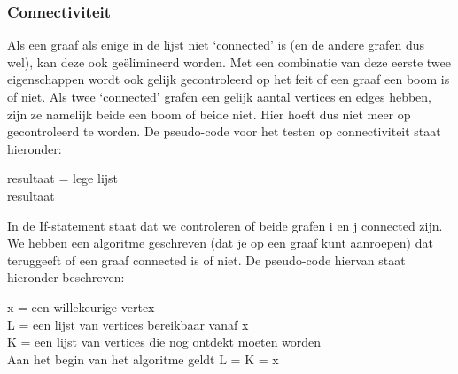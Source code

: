\documentclass{article}
\begin{document}
\subsubsection{Connectiviteit}
Als een graaf als enige in de lijst niet ‘connected’ is (en de andere grafen dus wel), kan deze ook ge\"elimineerd worden. Met een combinatie van deze eerste twee eigenschappen wordt ook gelijk gecontroleerd op het feit of een graaf een boom is of niet. Als twee ‘connected’ grafen een gelijk aantal vertices en edges hebben, zijn ze namelijk beide een boom of beide niet. Hier hoeft dus niet meer op gecontroleerd te worden. De pseudo-code voor het testen op connectiviteit staat hieronder:\\

\begin{algorithm}[H]
	resultaat = lege lijst\\
	\Return resultaat
\end{algorithm}
\vspace{5mm}

In de If-statement staat dat we controleren of beide grafen i en j connected zijn. We hebben een algoritme geschreven (dat je op een graaf kunt aanroepen) dat teruggeeft of een graaf connected is of niet. De pseudo-code hiervan staat hieronder beschreven:\\

\begin{algorithm}[H]
	x = een willekeurige vertex\\
	L = een lijst van vertices bereikbaar vanaf x\\
	K = een lijst van vertices die nog ontdekt moeten worden\\
	Aan het begin van het algoritme geldt L = K = x\\


\end{algorithm}
\vspace{5mm}
\end{document}
